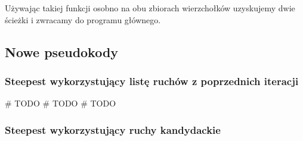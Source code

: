 \documentclass[11pt]{article}
\begin{document}
Używając takiej funkcji osobno na obu zbiorach wierzchołków uzyskujemy dwie ścieżki i zwracamy do programu głównego.

\subsection{Nowe pseudokody}\label{subsec:nowe-pseudokody}

\subsubsection{Steepest wykorzystujący listę ruchów z poprzednich iteracji}

# TODO # TODO # TODO


\subsubsection{Steepest wykorzystujący ruchy kandydackie}
\end{document}
